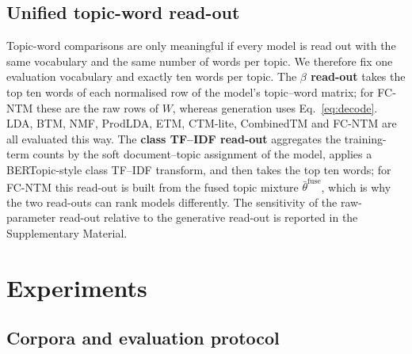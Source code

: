 \documentclass[11pt]{article}
\newcommand{\fcntm}{FC-NTM}
\begin{document}
\subsection{Unified topic-word read-out}
\label{sec:readout}

Topic-word comparisons are only meaningful if every model is read out with the same vocabulary and
the same number of words per topic. We therefore fix one evaluation vocabulary and exactly ten
words per topic. The \textbf{$\beta$ read-out} takes the top ten words of each normalised row of
the model's topic--word matrix; for \fcntm{} these are the raw rows of $W$, whereas generation
uses Eq.~\eqref{eq:decode}. LDA, BTM, NMF, ProdLDA, ETM, CTM-lite, CombinedTM and \fcntm{} are all
evaluated this way. The \textbf{class TF--IDF read-out} aggregates the training-term counts by the
soft document--topic assignment of the model, applies a BERTopic-style class TF--IDF transform,
and then takes the top ten words; for \fcntm{} this read-out is built from the fused topic mixture
$\bar\theta^{\mathrm{fuse}}$, which is why the two read-outs can rank models differently. The
sensitivity of the raw-parameter read-out relative to the generative read-out is reported in the
Supplementary Material.

\section{Experiments}

\subsection{Corpora and evaluation protocol}
\end{document}
